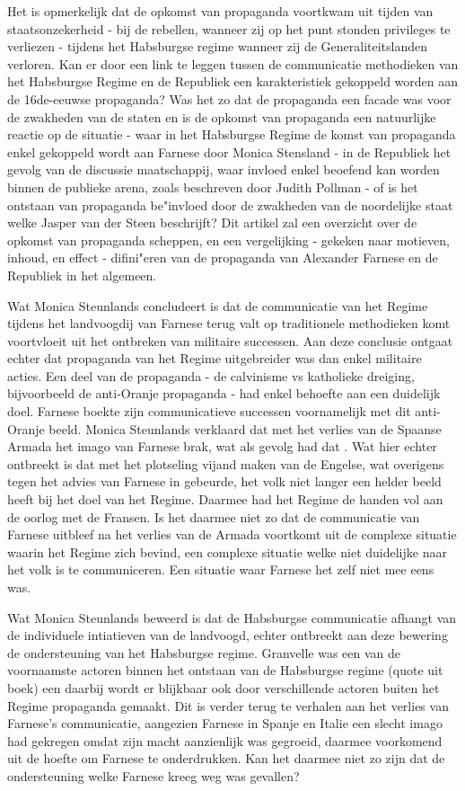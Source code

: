 \documentclass[11pt]{amsart}
\begin{document}
Het is opmerkelijk dat de opkomst van propaganda voortkwam uit tijden van staatsonzekerheid - bij de rebellen, wanneer
zij op het punt stonden privileges te verliezen - tijdens het Habsburgse regime wanneer zij de Generaliteitslanden
verloren. Kan er door een link te leggen tussen de communicatie methodieken van het Habsburgse Regime en de Republiek
een karakteristiek gekoppeld worden aan de 16de-eeuwse propaganda? Was het zo dat de propaganda een facade was voor de
zwakheden van de staten en is de opkomst van propaganda een natuurlijke reactie op de situatie - waar in het Habsburgse
Regime de komst van propaganda enkel gekoppeld wordt aan Farnese door Monica Stensland - in de Republiek het gevolg van
de discussie maatschappij, waar invloed enkel beoefend kan worden binnen de publieke arena, zoals beschreven door
Judith Pollman - of is het ontstaan van propaganda be"invloed door de zwakheden van de noordelijke staat welke Jasper
van der Steen beschrijft? Dit artikel zal een overzicht over de opkomst van propaganda scheppen, en een vergelijking -
gekeken naar motieven, inhoud, en effect - difini"eren van de propaganda van Alexander Farnese en de Republiek in het
algemeen.

Wat Monica Steunlands concludeert is dat de communicatie van het Regime tijdens het landvoogdij van Farnese terug valt
op traditionele methodieken komt voortvloeit uit het ontbreken van militaire successen. Aan deze conclusie ontgaat
echter dat propaganda van het Regime uitgebreider was dan enkel militaire acties. Een deel van de propaganda - de calvinisme vs katholieke dreiging, 
bijvoorbeeld de anti-Oranje propaganda - had enkel behoefte aan een duidelijk doel. Farnese boekte zijn communicatieve
successen voornamelijk met dit anti-Oranje beeld. Monica Steunlands verklaard dat met het verlies van de Spaanse Armada
het imago van Farnese brak, wat als gevolg had dat . Wat hier echter ontbreekt is dat met het plotseling vijand maken
van de Engelse, wat overigens tegen het advies van Farnese in gebeurde, het volk niet langer een helder beeld heeft bij
het doel van het Regime. Daarmee had het Regime de handen vol aan de oorlog met de Fransen. Is het daarmee niet zo dat
de communicatie van Farnese uitbleef na het verlies van de Armada voortkomt uit de complexe situatie waarin het Regime
zich bevind, een complexe situatie welke niet duidelijke naar het volk is te communiceren. Een situatie waar Farnese
het zelf niet mee eens was.

Wat Monica Steunlands beweerd is dat de Habsburgse communicatie afhangt van de individuele intiatieven van de landvoogd, echter ontbreekt aan deze bewering de ondersteuning van het Habsburgse regime.
Granvelle was een van de voornaamste actoren binnen het ontstaan van de Habsburgse regime (quote uit boek) een daarbij wordt er blijkbaar ook door verschillende actoren buiten het Regime propaganda gemaakt.
Dit is verder terug te verhalen aan het verlies van Farnese's communicatie, aangezien Farnese in Spanje en Italie een slecht imago had gekregen omdat zijn macht aanzienlijk was gegroeid, daarmee voorkomend
uit de hoefte om Farnese te onderdrukken. Kan het daarmee niet zo zijn dat de ondersteuning welke Farnese kreeg weg was gevallen?
\end{document}
